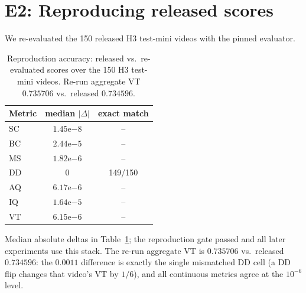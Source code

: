 \documentclass[10pt,twocolumn]{article}
\begin{document}
\section{E2: Reproducing released scores}\label{sec:e2}
We re-evaluated the 150 released H3 test-mini videos with the pinned evaluator.
\begin{table}[t]
\centering\small
\begin{tabular}{lcc}
\toprule
Metric & median $|\Delta|$ & exact match\\
\midrule
SC & $1.45\mathrm{e}{-8}$ & --\\
BC & $2.44\mathrm{e}{-5}$ & --\\
MS & $1.82\mathrm{e}{-6}$ & --\\
DD & $0$ & 149/150\\
AQ & $6.17\mathrm{e}{-6}$ & --\\
IQ & $1.64\mathrm{e}{-5}$ & --\\
VT & $6.15\mathrm{e}{-6}$ & --\\
\bottomrule
\end{tabular}
\caption{Reproduction accuracy: released vs.\ re-evaluated scores over the
150 H3 test-mini videos. Re-run aggregate VT $0.735706$ vs.\ released $0.734596$.}
\label{tab:e2}
\end{table}
Median absolute deltas in Table~\ref{tab:e2}; the reproduction gate passed and
all later experiments use this stack. The re-run aggregate VT is $0.735706$
vs.\ released $0.734596$: the $0.0011$ difference is exactly the single
mismatched DD cell (a DD flip changes that video's VT by $1/6$), and all
continuous metrics agree at the $10^{-6}$ level.
\end{document}
